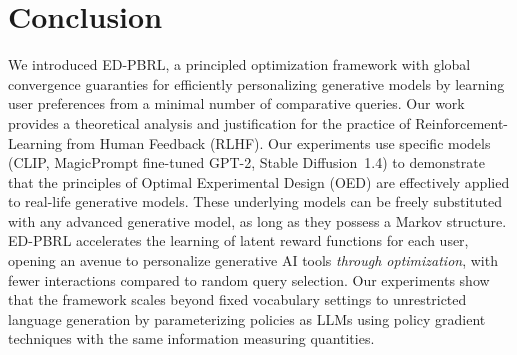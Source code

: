 \documentclass{article}
\begin{document}

\vspace{-0.2cm}\section{Conclusion}
\vspace{-0.2cm}We introduced ED-PBRL, a principled optimization framework with global convergence guaranties for efficiently personalizing generative models by learning user preferences from a minimal number of comparative queries. Our work provides a theoretical analysis and justification for the practice of Reinforcement-Learning from Human Feedback (RLHF). Our experiments use specific models (CLIP, MagicPrompt fine-tuned GPT-2, Stable Diffusion~1.4) to demonstrate that the principles of Optimal Experimental Design (OED) are effectively applied to real-life generative models. These underlying models can be freely substituted with any advanced generative model, as long as they possess a Markov structure. ED-PBRL accelerates the learning of latent reward functions for each user, opening an avenue to personalize generative AI tools \textit{through optimization}, with fewer interactions compared to random query selection. Our experiments show that the framework scales beyond fixed vocabulary settings to unrestricted language generation by parameterizing policies as LLMs using policy gradient techniques with the same information measuring quantities.
\end{document}
